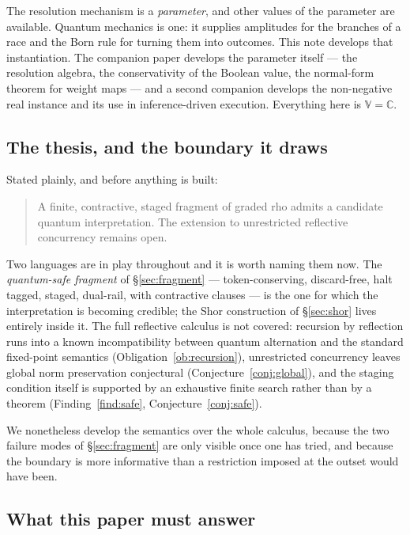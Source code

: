 \documentclass[11pt,a4paper]{article}
\theoremstyle{plain}
\theoremstyle{definition}
\theoremstyle{remark}
\newcommand{\V}{\mathbb{V}}
\newcommand{\Cx}{\mathbb{C}}
\begin{document}
The resolution mechanism is a \emph{parameter}, and other values of the
parameter are available. Quantum mechanics is one: it supplies amplitudes for
the branches of a race and the Born rule for turning them into outcomes. This
note develops that instantiation. The companion paper \cite{ResAlg} develops the
parameter itself --- the resolution algebra, the conservativity of the Boolean
value, the normal-form theorem for weight maps --- and a second companion
\cite{PLNPaper} develops the non-negative real instance and its use in
inference-driven execution. Everything here is $\V = \Cx$.

\subsection{The thesis, and the boundary it draws}\label{ssec:scope}

Stated plainly, and before anything is built:

\begin{quote}
A finite, contractive, staged fragment of graded rho admits a candidate quantum
interpretation. The extension to unrestricted reflective concurrency remains
open.
\end{quote}

Two languages are in play throughout and it is worth naming them now. The
\emph{quantum-safe fragment} of \S\ref{sec:fragment} --- token-conserving,
discard-free, halt tagged, staged, dual-rail, with contractive clauses --- is
the one for which the interpretation is becoming credible; the Shor construction
of \S\ref{sec:shor} lives entirely inside it. The full reflective calculus is
not covered: recursion by reflection runs into a known incompatibility between
quantum alternation and the standard fixed-point semantics
(Obligation~\ref{ob:recursion}), unrestricted concurrency leaves global norm
preservation conjectural (Conjecture~\ref{conj:global}), and the staging
condition itself is supported by an exhaustive finite search rather than by a
theorem (Finding~\ref{find:safe}, Conjecture~\ref{conj:safe}).

We nonetheless develop the semantics over the whole calculus, because the two
failure modes of \S\ref{sec:fragment} are only visible once one has tried, and
because the boundary is more informative than a restriction imposed at the
outset would have been.

\subsection{What this paper must answer}
\end{document}
